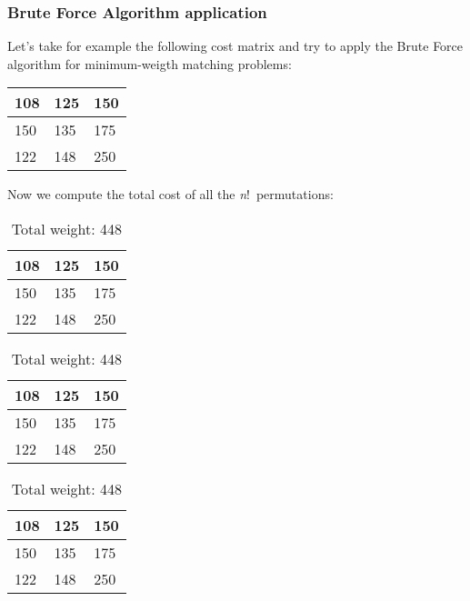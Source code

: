 \subsubsection{Brute Force Algorithm application}

Let's take for example the following cost matrix and try to apply the Brute Force algorithm for minimum-weigth matching problems:

\begin{table}[H]
    \centering
    \begin{tabular}{|m{0.5cm}|m{0.5cm}|m{0.5cm}|}
      \hline
      108 & 125 & 150 \\
      \hline
      150 & 135 & 175 \\
      \hline
      122 & 148 & 250 \\
      \hline
    \end{tabular}
    \end{table}

Now we compute the total cost of all the \textit{n}!\ permutations: 

\begin{table}[H]
    \begin{minipage}[b]{0.3\textwidth}
      \centering
      \begin{tabular}{|m{0.5cm}|m{0.5cm}|m{0.5cm}|}
        \hline
        \cellcolor{yellow!25} 108 & 125 & 150 \\
        \hline
        150 & \cellcolor{yellow!25} 135 & 175 \\
        \hline
        122 & 148 & \cellcolor{yellow!25} 250 \\
        \hline
      \end{tabular}
      \caption{Total weight: 493}
      \label{tab:perm1}
    \end{minipage}
    \hfill
    \begin{minipage}[b]{0.3\textwidth}
      \centering
      \begin{tabular}{|m{0.5cm}|m{0.5cm}|m{0.5cm}|}
        \hline
        108 & \cellcolor{yellow!25} 125 & 150 \\
        \hline
        150 & 135 & \cellcolor{yellow!25}175 \\
        \hline
        \cellcolor{yellow!25}122 & 148 & 250 \\
        \hline
      \end{tabular}
      \caption{Total weight: 422}
      \label{tab:perm2}
    \end{minipage}
    \hfill
    \begin{minipage}[b]{0.3\textwidth}
      \centering
      \begin{tabular}{|m{0.5cm}|m{0.5cm}|m{0.5cm}|}
        \hline
        108 & 125 & \cellcolor{yellow!25}150 \\
        \hline
        \cellcolor{yellow!25} 150 &  135 & 175 \\
        \hline
        122 & \cellcolor{yellow!25} 148 & 250 \\
        \hline
      \end{tabular}
      \caption{Total weight: 448}
      \label{tab:perm3}
    \end{minipage}
  \end{table}
  

